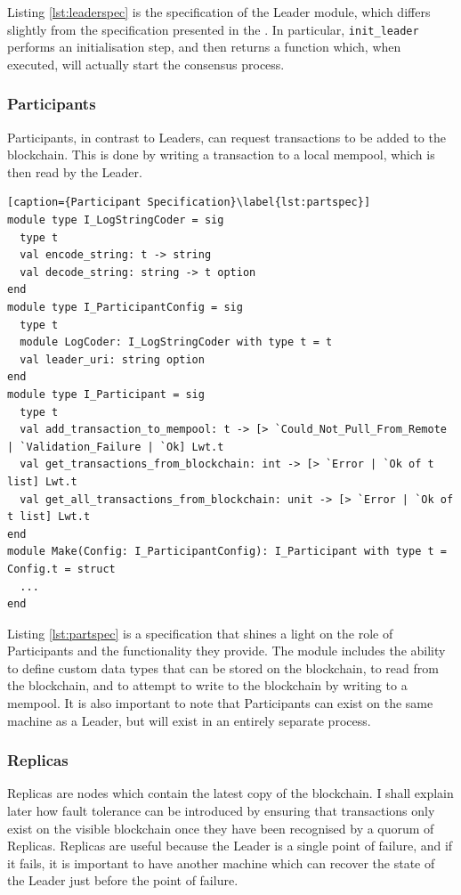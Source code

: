 \documentclass[12pt,a4paper,twoside,openright]{report}
\begin{document}
	Listing \ref{lst:leaderspec} is the specification of the Leader module, which differs slightly from the specification presented in the .
	In particular, \texttt{init\_leader} performs an initialisation step, and then returns a function which, when executed, will actually start the consensus process.

	\subsubsection*{Participants}
	Participants, in contrast to Leaders, can request transactions to be added to the blockchain. 
	This is done by writing a transaction to a local mempool, which is then read by the Leader.\\

	\begin{lstlisting}[caption={Participant Specification}\label{lst:partspec}]
module type I_LogStringCoder = sig
  type t
  val encode_string: t -> string
  val decode_string: string -> t option
end
module type I_ParticipantConfig = sig
  type t
  module LogCoder: I_LogStringCoder with type t = t
  val leader_uri: string option
end
module type I_Participant = sig
  type t
  val add_transaction_to_mempool: t -> [> `Could_Not_Pull_From_Remote | `Validation_Failure | `Ok] Lwt.t
  val get_transactions_from_blockchain: int -> [> `Error | `Ok of t list] Lwt.t
  val get_all_transactions_from_blockchain: unit -> [> `Error | `Ok of t list] Lwt.t
end
module Make(Config: I_ParticipantConfig): I_Participant with type t = Config.t = struct
  ...
end
	\end{lstlisting}

	Listing \ref{lst:partspec} is a specification that shines a light on the role of Participants and the functionality they provide.
	The module includes the ability to define custom data types that can be stored on the blockchain, to read from the blockchain, and to attempt to write to the blockchain by writing to a mempool.
	It is also important to note that Participants can exist on the same machine as a Leader, but will exist in an entirely separate process.

	\subsubsection*{Replicas}
	Replicas are nodes which contain the latest copy of the blockchain. 
	I shall explain later how fault tolerance can be introduced by ensuring that transactions only exist on the visible blockchain once they have been recognised by a quorum of Replicas.
	Replicas are useful because the Leader is a single point of failure, and if it fails, it is important to have another machine which can recover the state of the Leader just before the point of failure.
	
\end{document}

